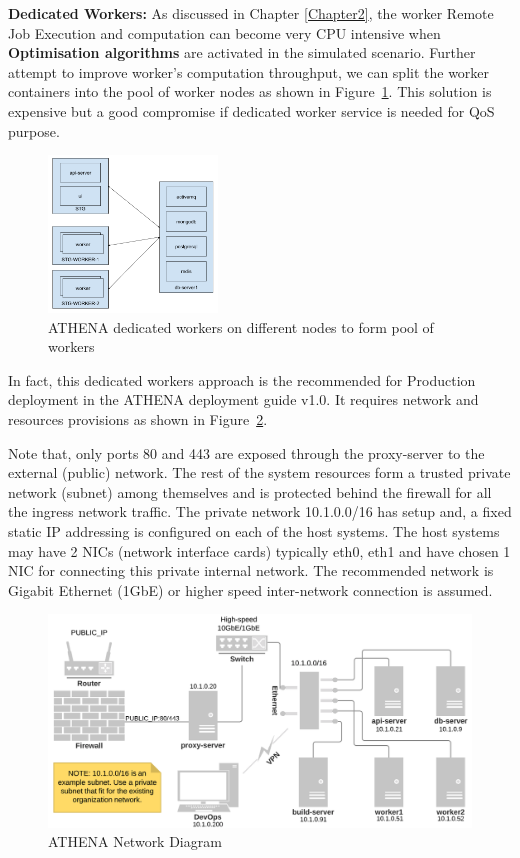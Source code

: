 \noindent \textbf{Dedicated Workers:} \quad As discussed in Chapter \ref{Chapter2}, the worker Remote Job Execution and computation can become very CPU intensive when \textbf{Optimisation algorithms} are activated in the simulated scenario. Further attempt to improve worker's computation throughput, we can split the worker containers into the pool of worker nodes as shown in Figure~\ref{fig:dedicatedWorkers}. This solution is expensive but a good compromise if dedicated worker service is needed for QoS purpose.

\begin{figure}[H]
\centering
\includegraphics[width=0.4\textwidth]{Figures/ATHENA_dedicated_workers}
\decoRule
\caption[ATHENA Dedicated Workers]{ATHENA dedicated workers on different nodes to form pool of workers}
\label{fig:dedicatedWorkers}
\end{figure}

In fact, this dedicated workers approach is the recommended for Production deployment in the ATHENA deployment guide v1.0\parencite{athenaAllDoc}. It requires network and resources provisions as shown in Figure~\ref{fig:deployNetwork}. 

Note that, only ports 80 and 443 are exposed through the proxy-server to the external (public) network. The rest of the system resources form a trusted private network (subnet) among themselves and is protected behind the firewall for all the ingress network traffic. The private network 10.1.0.0/16 has setup and, a fixed static IP addressing is configured on each of the host systems. The host systems may have 2 NICs (network interface cards) typically eth0, eth1 and have chosen 1 NIC for connecting this private internal network. The recommended network is Gigabit Ethernet (1GbE) or higher speed inter-network connection is assumed.

\begin{figure}[H]
\centering
\includegraphics[width=0.7\paperwidth]{Figures/ATHENA_deploy_network_diagram}
\decoRule
\caption[ATHENA Network Diagram]{ATHENA Network Diagram}
\label{fig:deployNetwork}
\end{figure}

